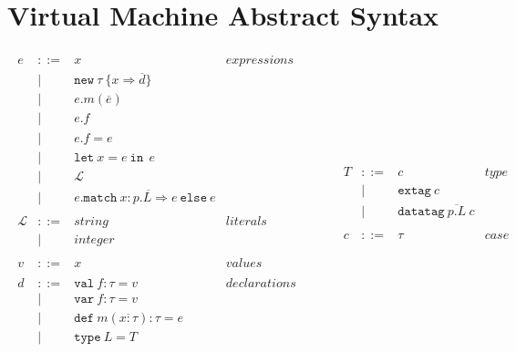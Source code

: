 \documentclass{article}
\newcommand{\keywadj}[1]{\mathtt{#1}}
\newcommand{\keyw}[1]{\keywadj{#1}~}
\begin{document}
\section{Virtual Machine Abstract Syntax}

\[
\begin{array}{lll}
\begin{array}{lllr}
e & ::= & x & expressions \\
& | & \keywadj{new}~\tau~\{x \Rightarrow \overline{d}\}&\\
& | & e.m(\overline{e}) &\\
& | & e.f &\\
& | & e.f = e&\\
& | & \keyw{let} x=e~\keyw{in}~e &\\
& | & \mathscr{L} &\\
& | & e.\keyw{match} \overline{x:p.L \Rightarrow e} ~\keyw{else} e &\\
&&\\
\mathscr{L} & ::= & string & literals \\
& | & integer &\\
&&\\
v & ::= & x & values \\
&&\\
d & ::= & \keyw{val} f : \tau = v & declarations \\
  & |   & \keyw{var} f : \tau = v &\\
  & |   & \keyw{def} m(\overline{x:\tau}) : \tau = e &\\
  & |   & \keyw{type} L = T &\\
&&\\
\end{array}
& ~~~~~~
&
\begin{array}{lllr}
T & ::= & c & \textit{type desc.}\\
& | & \keyw{extag} c &\\
& | & \keyw{datatag} \overline{p.L}~c &\\
&&\\
c & ::= & \tau & \textit{case desc.} \\

\end{array}
\end{array}\]
\end{document}
